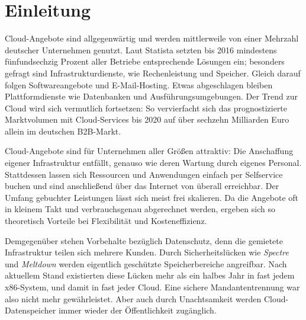 \chapter{Einleitung}

Cloud-Angebote sind allgegenwärtig und werden mittlerweile von einer Mehrzahl deutscher Unternehmen genutzt. Laut Statista setzten bis 2016 mindestens fünfundsechzig Prozent aller Betriebe entsprechende Lösungen ein;
besonders gefragt sind Infrastrukturdienste, wie Rechenleistung und Speicher. Gleich darauf folgen Softwareangebote und E-Mail-Hosting. Etwas abgeschlagen bleiben Plattformdienste wie Datenbanken und Ausführungsumgebungen. %
Der Trend zur Cloud wird sich vermutlich fortsetzen: So vervierfacht sich das prognostizierte Marktvolumen mit Cloud-Services bis 2020 auf über sechzehn Milliarden Euro allein im deutschen B2B-Markt. %

Cloud-Angebote sind für Unternehmen aller Größen attraktiv: Die Anschaffung eigener Infrastruktur entfällt, genauso wie deren Wartung durch eigenes Personal. Stattdessen lassen sich Ressourcen und Anwendungen einfach per Selfservice buchen und sind anschließend über das Internet von überall erreichbar. Der Umfang gebuchter Leistungen lässt sich meist frei skalieren. Da die Angebote oft in kleinem Takt und verbrauchsgenau abgerechnet werden, ergeben sich so theoretisch Vorteile bei Flexibilität und Kosteneffizienz.

Demgegenüber stehen Vorbehalte bezüglich Datenschutz, denn die gemietete Infrastruktur teilen sich mehrere Kunden. Durch Sicherheitslücken wie \emph{Spectre} und \emph{Meltdown} 
werden eigentlich geschützte Speicherbereiche angreifbar. Nach aktuellem Stand existierten diese Lücken mehr als ein halbes Jahr in fast jedem x86-System, und damit in fast jeder Cloud. Eine sichere Mandantentrennung war also nicht mehr gewährleistet. Aber auch durch Unachtsamkeit werden Cloud-Datenspeicher immer wieder der Öffentlichkeit zugänglich.

